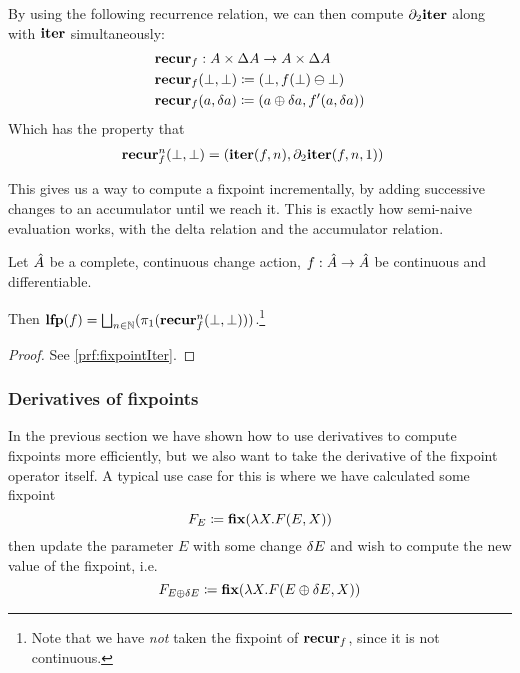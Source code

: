 By using the following recurrence relation, 
we can then compute $\partial_2{\mathbf{iter}}$ along with $\mathbf{iter}$ simultaneously:
\begin{align*}
  &\mathbf{recur}_f : A \times \Delta A \rightarrow A \times \Delta A\\
  &\mathbf{recur}_f (\bot, \bot) \coloneqq (\bot, f(\bot) \ominus \bot)\\
  &\mathbf{recur}_f (a, \delta a) \coloneqq (a \oplus \delta a, f'(a, \delta a))
\end{align*}
Which has the property that
\begin{align*}
  &\mathbf{recur}_f^n (\bot, \bot) = (\mathbf{iter}(f, n), \partial_2{\mathbf{iter}}(f, n, 1))
\end{align*}

This gives us a way to compute a fixpoint incrementally, by adding successive
changes to an accumulator until we reach it. This is exactly how
semi-naive evaluation works, with the delta relation and the accumulator relation.

\begin{thm}[name=Incremental computation of least fixpoints, restate=fixpointIter]
\label{thm:fixpointIter}
  Let $\hat{A}$ be a complete, continuous change action, $f: \hat{A} \rightarrow
  \hat{A}$ be continuous and differentiable.

  Then $\mathbf{lfp}(f) = \bigsqcup_{n \in \mathbb{N}}(\pi_1(\mathbf{recur}_f^n(\bot, \bot)))$.\footnote{
    Note that we have \emph{not} taken the fixpoint of $\mathbf{recur}_f$, since it is
    not continuous.}
\end{thm}
\ifproofs
\begin{proof}
  See \cref{prf:fixpointIter}.
\end{proof}
\fi

\subsubsection{Derivatives of fixpoints}
\label{sec:fixpointDerivatives}

In the previous section we have shown how to use derivatives to compute fixpoints
more efficiently, but we also want to take the derivative of the fixpoint
operator itself. A typical use case for this is where we have calculated some fixpoint
\begin{displaymath}
  F_{E} \coloneqq \mathbf{fix} (\lambda X . F(E, X))
\end{displaymath}
then update the parameter $E$ with some change $\delta E$ and wish to compute the new
value of the fixpoint, i.e.
\begin{displaymath}
  F_{E \oplus \delta E} \coloneqq \mathbf{fix} (\lambda X . F(E \oplus \delta E, X))
\end{displaymath}

